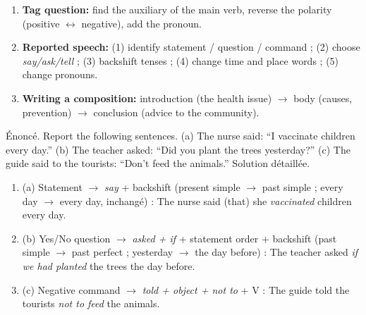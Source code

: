 \documentclass[11pt]{article}
\begin{document}
\begin{methode}
\begin{enumerate}
\item \textbf{Tag question:} find the auxiliary of the main verb, reverse the polarity (positive $\leftrightarrow$ negative), add the pronoun.
\item \textbf{Reported speech:} (1) identify statement / question / command ; (2) choose \emph{say/ask/tell} ; (3) backshift tenses ; (4) change time and place words ; (5) change pronouns.
\item \textbf{Writing a composition:} introduction (the health issue) $\to$ body (causes, prevention) $\to$ conclusion (advice to the community).
\end{enumerate}
\end{methode}

\begin{exoresolu}
Énoncé. Report the following sentences. (a) The nurse said: ``I vaccinate children every day.'' (b) The teacher asked: ``Did you plant the trees yesterday?'' (c) The guide said to the tourists: ``Don't feed the animals.''
\tcblower
Solution détaillée.
\begin{enumerate}
\item (a) Statement $\to$ \emph{say} + backshift (present simple $\to$ past simple ; every day $\to$ every day, inchangé) : The nurse said (that) she \emph{vaccinated} children every day.
\item (b) Yes/No question $\to$ \emph{asked + if} + statement order + backshift (past simple $\to$ past perfect ; yesterday $\to$ the day before) : The teacher asked \emph{if we had planted} the trees the day before.
\item (c) Negative command $\to$ \emph{told + object + not to} + V : The guide told the tourists \emph{not to feed} the animals.
\end{enumerate}
\end{exoresolu}
\end{document}
